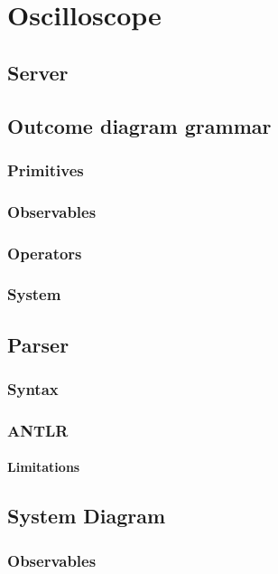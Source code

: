\chapter{Oscilloscope}
    \section{Server}
    
    \section{Outcome diagram grammar}
        \subsection{Primitives}
        \subsection{Observables}
        \subsection{Operators}
        \subsection{System}
        
    \section{Parser}
        \subsection{Syntax}
        \subsection{ANTLR}
            \subsubsection{Limitations}
    
    \section{System Diagram}
        \subsection{Observables}
